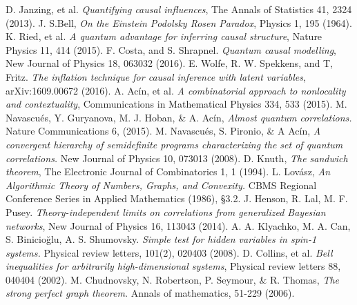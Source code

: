 \documentclass[letterpaper]{article}
\begin{document}
\begin{thebibliography}{}
          D. Janzing, et al. {\em Quantifying causal influences}, The Annals of Statistics 41, 2324 (2013).
      J. S.Bell, {\em On the Einstein Podolsky Rosen Paradox}, Physics 1, 195 (1964).
     K. Ried, et al. {\em A quantum advantage for inferring causal structure}, Nature Physics 11, 414 (2015).
       F. Costa, and S. Shrapnel. {\em Quantum causal modelling}, New Journal of Physics 18, 063032 (2016).
      E. Wolfe, R. W. Spekkens, and T, Fritz. {\em The inflation technique for causal inference with latent variables}, arXiv:1609.00672 (2016). 
     A. Acín, et al. {\em A combinatorial approach to nonlocality and contextuality}, Communications in Mathematical Physics 334, 533 (2015).
      M. Navascués, Y. Guryanova, M. J. Hoban, \& A. Acín, {\em Almost quantum correlations.}
         Nature Communications 6, (2015).
      M. Navascués, S. Pironio, \& A Acín, 
         {\em A convergent hierarchy of semidefinite programs characterizing the
         set of quantum correlations.}
         New Journal of Physics 10, 073013 (2008).
    D. Knuth, {\em The sandwich theorem}, The Electronic Journal of Combinatorics 1, 1 (1994).
      L. Lovász, 
         {\em An Algorithmic Theory of Numbers, Graphs, and Convexity.}
         CBMS Regional Conference Series in Applied Mathematics (1986), §3.2.
  J. Henson, R. Lal, M. F. Pusey. {\em Theory-independent limits on correlations from generalized Bayesian networks}, New Journal of Physics 16, 113043 (2014).
    A. A. Klyachko, M. A. Can, S. Binicioğlu, A. S. Shumovsky. {\em Simple test for hidden variables in spin-1 systems.}
         Physical review letters, 101(2), 020403 (2008).
    D. Collins, et al. {\em Bell inequalities for arbitrarily high-dimensional systems}, Physical review letters 88, 040404 (2002).
      M. Chudnovsky, N. Robertson, P. Seymour, \& R. Thomas, 
         {\em The strong perfect graph theorem.} 
         Annals of mathematics, 51-229 (2006).
         




\end{thebibliography}
\end{document}
